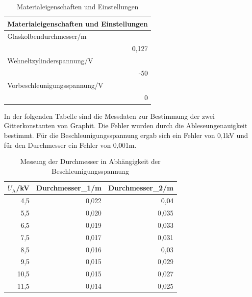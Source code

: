 \documentclass[12pt,a4paper]{article}
\begin{document}
\begin{table}[H]
\caption{Materialeigenschaften und Einstellungen}
\begin{center}
\begin{tabular}{|l|}
\hline
Materialeigenschaften und Einstellungen \\ \hline
Glaskolbendurchmesser/m \\ \hline
\multicolumn{1}{|r|}{0,127} \\ \hline
Wehneltzylinderspannung/V \\ \hline
\multicolumn{1}{|r|}{-50} \\ \hline
Vorbeschleunigungsspannung/V \\ \hline
\multicolumn{1}{|r|}{0} \\ \hline
\end{tabular}
\end{center}
\label{tab:a_2_m}
\end{table}

\newpage
In der folgenden Tabelle sind die Messdaten zur Bestimmung der zwei Gitterkonstanten von Graphit. Die Fehler wurden durch die Ableseungenauigkeit bestimmt. Für die Beschleunigungsspannung ergab sich ein Fehler von 0,1kV und für den Durchmesser ein Fehler von 0,001m.

\begin{table}[H]
\caption{Messung der Durchmesser in Abhängigkeit der Beschleunigungsspannung}
\begin{center}
\begin{tabular}{|r|r|r|}
\hline
$U_\text{A}$/kV & Durchmesser\_1/m & Durchmesser\_2/m \\ \hline
4,5 & 0,022 & 0,04 \\ \hline
5,5 & 0,020 & 0,035 \\ \hline
6,5 & 0,019 & 0,033 \\ \hline
7,5 & 0,017 & 0,031 \\ \hline
8,5 & 0,016 & 0,03 \\ \hline
9,5 & 0,015 & 0,029 \\ \hline
10,5 & 0,015 & 0,027 \\ \hline
11,5 & 0,014 & 0,025 \\ \hline
\end{tabular}
\end{center}
\label{tab:a_2}
\end{table}
\end{document}
